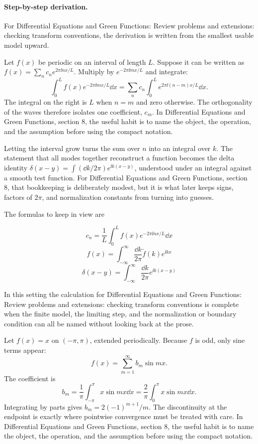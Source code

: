 \paragraph{Step-by-step derivation.}

For Differential Equations and Green Functions: Review problems and extensions: checking transform conventions, the derivation is written from the smallest usable model upward.

Let \(f(x)\) be periodic on an interval of length \(L\).  Suppose it can be written as \(f(x)=\sum_n c_ne^{2\pi\ii nx/L}\).  Multiply by \(e^{-2\pi\ii mx/L}\) and integrate:
\[
  \int_0^L f(x)e^{-2\pi\ii mx/L}\dd x
  =
  \sum_n c_n\int_0^L e^{2\pi\ii(n-m)x/L}\dd x.
\]
The integral on the right is \(L\) when \(n=m\) and zero otherwise.  The orthogonality of the waves therefore isolates one coefficient, \(c_m\).  In Differential Equations and Green Functions, section 8, the useful habit is to name the object, the operation, and the assumption before using the compact notation.

Letting the interval grow turns the sum over \(n\) into an integral over \(k\).  The statement that all modes together reconstruct a function becomes the delta identity \(\delta(x-y)=\int(\dd k/2\pi)e^{\ii k(x-y)}\), understood under an integral against a smooth test function.  For Differential Equations and Green Functions, section 8, that bookkeeping is deliberately modest, but it is what later keeps signs, factors of \(2\pi\), and normalization constants from turning into guesses.

The formulas to keep in view are

\[
  c_n=\frac1L\int_0^L f(x)e^{-2\pi\ii nx/L}\dd x
\]
\[
  f(x)=\int_{-\infty}^{\infty}\frac{\dd k}{2\pi}\tilde f(k)e^{\ii kx}
\]
\[
  \delta(x-y)=\int_{-\infty}^{\infty}\frac{\dd k}{2\pi}e^{\ii k(x-y)}
\]

In this setting the calculation for Differential Equations and Green Functions: Review problems and extensions: checking transform conventions is complete when the finite model, the limiting step, and the normalization or boundary condition can all be named without looking back at the prose.




\begin{example}
Let \(f(x)=x\) on \((-\pi,\pi)\), extended periodically.  Because \(f\) is odd, only sine terms appear:
\[
  f(x)=\sum_{m=1}^\infty b_m\sin mx.
\]
The coefficient is
\[
  b_m=\frac1\pi\int_{-\pi}^\pi x\sin mx\dd x
  =\frac2\pi\int_0^\pi x\sin mx\dd x.
\]
Integrating by parts gives \(b_m=2(-1)^{m+1}/m\).  The discontinuity at the endpoint is exactly where pointwise convergence must be treated with care.  In Differential Equations and Green Functions, section 8, the useful habit is to name the object, the operation, and the assumption before using the compact notation.
\end{example}



